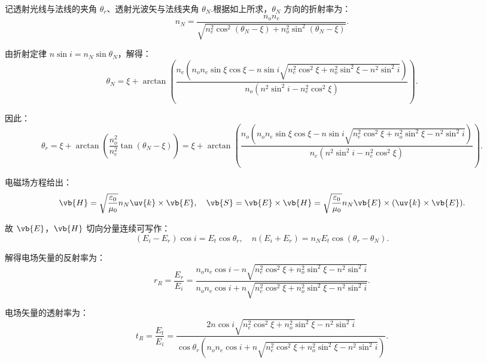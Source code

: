 记透射光线与法线的夹角 \(\theta_r\)、透射光波矢与法线夹角 \(\theta_N\).根据如上所求，\(\theta_N\) 方向的折射率为：
\begin{equation*}
	n_N = \dfrac{n_o n_e}{\sqrt{n_e^2 \cos^2(\theta_N - \xi) + n_o^2 \sin^2(\theta_N - \xi)}}.
\end{equation*}

由折射定律 \(n \sin i = n_N \sin \theta_N\)，解得：
\begin{equation*}
	\theta_N = \xi + \arctan\left( \dfrac{n_e \left( n_o n_e \sin\xi \cos\xi - n \sin i \sqrt{n_e^2 \cos^2\xi + n_o^2 \sin^2\xi - n^2 \sin^2 i} \right)}{n_o \left( n^2 \sin^2 i - n_e^2 \cos^2\xi \right)} \right).
\end{equation*}

因此：
\begin{equation*}
	\theta_r = \xi + \arctan\left( \dfrac{n_o^2}{n_e^2} \tan(\theta_N - \xi) \right) = \xi + \arctan\left( \dfrac{n_o \left( n_o n_e \sin\xi \cos\xi - n \sin i \sqrt{n_e^2 \cos^2\xi + n_o^2 \sin^2\xi - n^2 \sin^2 i} \right)}{n_e \left( n^2 \sin^2 i - n_e^2 \cos^2\xi \right)} \right).
\end{equation*}

电磁场方程给出：
\begin{equation*}
	\vb{H} = \sqrt{\dfrac{\varepsilon_0}{\mu_0}} n_N \uv{k} \times \vb{E}, \quad \vb{S} = \vb{E} \times \vb{H} = \sqrt{\dfrac{\varepsilon_0}{\mu_0}} n_N \vb{E} \times (\uv{k} \times \vb{E}).
\end{equation*}

故 \(\vb{E}\)，\(\vb{H}\) 切向分量连续可写作：
\begin{equation*}
	(E_i - E_r) \cos i = E_t \cos\theta_r, \quad n (E_i + E_r) = n_N E_t \cos(\theta_r - \theta_N).
\end{equation*}

解得电场矢量的反射率为：
\begin{equation*}
	r_R = \dfrac{E_r}{E_i} = \dfrac{n_o n_e \cos i - n \sqrt{n_e^2 \cos^2\xi + n_o^2 \sin^2\xi - n^2 \sin^2 i}}{n_o n_e \cos i + n \sqrt{n_e^2 \cos^2\xi + n_o^2 \sin^2\xi - n^2 \sin^2 i}}.
\end{equation*}

电场矢量的透射率为：
\begin{equation*}
	t_R = \dfrac{E_t}{E_i} = \dfrac{2 n \cos i \sqrt{n_e^2 \cos^2\xi + n_o^2 \sin^2\xi - n^2 \sin^2 i}}{\cos\theta_r \left( n_o n_e \cos i + n \sqrt{n_e^2 \cos^2\xi + n_o^2 \sin^2\xi - n^2 \sin^2 i} \right)}.
\end{equation*}

